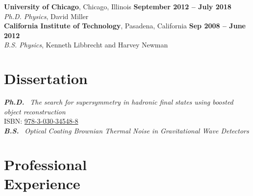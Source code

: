 \documentclass[margin,line]{resume}
\let\origsection\section%
\let\section\subsection%
\let\section\origsection%
\begin{document}
\begin{resume}
\textbf{University of Chicago}, Chicago, Illinois \hfill \textbf{September 2012 -- July 2018}\\
\textsl{Ph.D. Physics}, David Miller\\
%
\textbf{California Institute of Technology}, Pasadena, California \hfill \textbf{ Sep 2008 -- June 2012}\\
\textsl{B.S. Physics}, Kenneth Libbrecht and Harvey Newman
%
%

\section{\mysidestyle Dissertation}

\textbf{\textsl{Ph.D.}} \href{https://kratsg.github.io/thesis/?utm_source=cv}{}~\textsl{The search for supersymmetry in hadronic final states using boosted object reconstruction}\\
ISBN: \href{https://books.google.com/books?vid=ISBN978-3-030-34548-8}{978-3-030-34548-8}\\[2.5mm]
\textbf{\textsl{B.S.}}\hspace{3mm} \href{https://www.dropbox.com/s/h0mpop96cn563bq/Thesis.pdf?dl=0}{}~\textsl{Optical Coating Brownian Thermal Noise in Gravitational Wave Detectors}

\section{\mysidestyle Professional\\Experience}


\end{resume}
\end{document}
